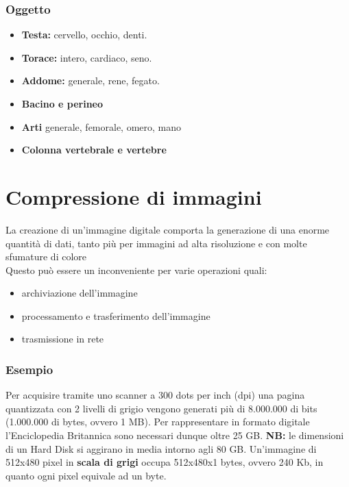 \subsubsection{Oggetto}
\begin{itemize}
    \item \textbf{Testa:} cervello, occhio, denti.
    \item \textbf{Torace:} intero, cardiaco, seno.
    \item \textbf{Addome:} generale, rene, fegato.
    \item \textbf{Bacino e perineo}
    \item \textbf{Arti} generale, femorale, omero, mano
    \item \textbf{Colonna vertebrale e vertebre}
\end{itemize}

\section{Compressione di immagini}
La creazione di un'immagine digitale comporta la generazione di
una enorme quantità di dati, tanto più per immagini ad alta risoluzione e con molte sfumature di colore
\\Questo può essere un inconveniente per varie operazioni quali:

\begin{itemize}
    \item archiviazione dell'immagine
    \item processamento e trasferimento dell'immagine
    \item trasmissione in rete
\end{itemize}

\subsubsection*{Esempio}
Per acquisire tramite uno scanner a 300 dots per inch (dpi) una pagina quantizzata con 2 livelli di grigio vengono generati più di
8.000.000 di bits (1.000.000 di bytes, ovvero 1 MB). Per rappresentare in formato digitale l'Enciclopedia Britannica sono necessari dunque oltre 25 GB.
\textbf{NB:} le dimensioni di un Hard Disk si aggirano in media intorno agli
80 GB. Un'immagine di 512x480 pixel in \textbf{scala di grigi} occupa 512x480x1
bytes, ovvero 240 Kb, in quanto ogni pixel equivale ad un byte.

